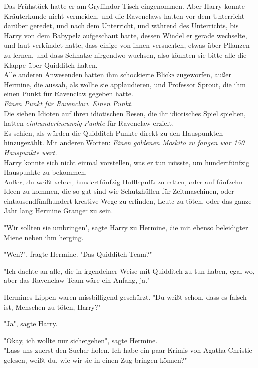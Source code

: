 {Das Frühstück hatte er am Gryffindor-Tisch eingenommen. Aber Harry konnte Kräuterkunde nicht vermeiden, und die Ravenclaws hatten vor dem Unterricht darüber geredet, und nach dem Unterricht, und während des Unterrichts, bis Harry von dem Babypelz aufgeschaut hatte, dessen Windel er gerade wechselte, und laut verkündet hatte, dass einige von ihnen versuchten, etwas über Pflanzen zu lernen, und dass Schnatze nirgendwo wuchsen, also könnten sie bitte alle die Klappe über Quidditch halten.\\ Alle anderen Anwesenden hatten ihm schockierte Blicke zugeworfen, außer Hermine, die aussah, als wollte sie applaudieren, und Professor Sprout, die ihm einen Punkt für Ravenclaw gegeben hatte.\\ \emph{Einen Punkt für Ravenclaw. Einen Punkt.}\\ Die sieben Idioten auf ihren idiotischen Besen, die ihr idiotisches Spiel spielten, hatten \emph{einhundertneunzig Punkte} für Ravenclaw erzielt.\\ Es schien, als würden die Quidditch-Punkte direkt zu den Hauspunkten hinzugezählt. Mit anderen Worten: \emph{Einen goldenen Moskito zu fangen war 150 Hauspunkte wert.}\\ Harry konnte sich nicht einmal vorstellen, was er tun müsste, um hundertfünfzig Hauspunkte zu bekommen.\\ Außer, du weißt schon, hundertfünfzig Hufflepuffs zu retten, oder auf fünfzehn Ideen zu kommen, die so gut sind wie Schutzhüllen für Zeitmaschinen, oder eintausendfünfhundert kreative Wege zu erfinden, Leute zu töten, oder das ganze Jahr lang Hermine Granger zu sein.

"Wir sollten sie umbringen", sagte Harry zu Hermine, die mit ebenso beleidigter Miene neben ihm herging.

"Wen?", fragte Hermine. "Das Quidditch-Team?"

"Ich dachte an alle, die in irgendeiner Weise mit Quidditch zu tun haben, egal wo, aber das Ravenclaw-Team wäre ein Anfang, ja."

Hermines Lippen waren missbilligend geschürzt. "Du weißt schon, dass es falsch ist, Menschen zu töten, Harry?"

"Ja", sagte Harry.

"Okay, ich wollte nur sichergehen", sagte Hermine.\\ "Lass uns zuerst den Sucher holen. Ich habe ein paar Krimis von Agatha Christie gelesen, weißt du, wie wir sie in einen Zug bringen können?"

}
